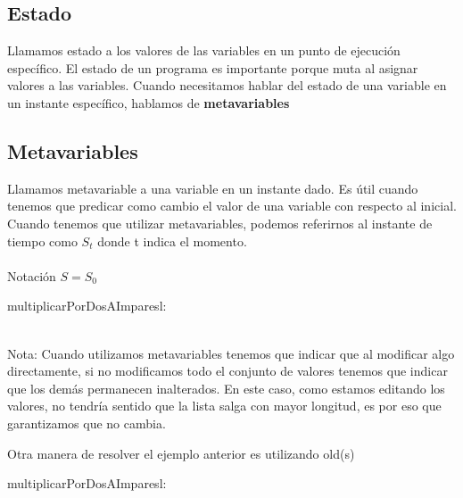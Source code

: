 \documentclass[10pt,a4paper]{article}
\begin{document}
\subsection*{Estado}
Llamamos estado a los valores de las variables en un punto de ejecución específico. El estado de un programa es importante porque muta al asignar valores a las variables.
Cuando necesitamos hablar del estado de una variable en un instante específico, hablamos de \textbf{metavariables} \\ 

\subsection*{Metavariables}
Llamamos metavariable a una variable en un instante dado. Es útil cuando tenemos que predicar como cambio el valor de una variable con respecto al inicial. \\
Cuando tenemos que utilizar metavariables, podemos referirnos al instante de tiempo como \(S_{t}\) donde t indica el momento. \\ \\ 
Notación \(S = S_{0}\)

\begin{proc}{multiplicarPorDosAImpares}{\Inout l: \TLista{\ent}}{}
\end{proc}
\leavevmode
\\
Nota: Cuando utilizamos metavariables tenemos que indicar que al modificar algo directamente, si no modificamos todo el conjunto de valores tenemos que indicar que los demás permanecen inalterados. En este caso, como estamos editando los valores, no tendría sentido que la lista salga con mayor longitud, es por eso que garantizamos que no cambia. 

Otra manera de resolver el ejemplo anterior es utilizando old(s)
\begin{proc}{multiplicarPorDosAImpares}{\Inout l: \TLista{\ent}}{}
\end{proc}
\leavevmode
\\
\end{document}

